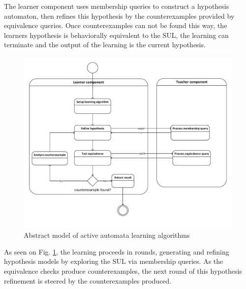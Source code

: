 \noindent The learner component uses membership queries to construct a hypothesis automaton, then refines this hypothesis by the counterexamples provided by equivalence queries. Once counterexamples can not be found this way, the learners hypothesis is behaviorally equivalent to the SUL, the learning can terminate and the output of the learning is the current hypothesis.

\begin{figure}[H]
	\centering
	\includegraphics[width=1.0\linewidth]{figures/flowchartlearning}
	\caption{Abstract model of active automata learning algorithms}
	\label{fig:flowchartlearning}
\end{figure}

As seen on Fig. \ref{fig:flowchartlearning}, the learning proceeds in rounds, generating and refining hypothesis models by exploring the SUL via membership queries. As the equivalence checks produce counterexamples, the next round of this hypothesis refinement is steered by the counterexamples produced.

